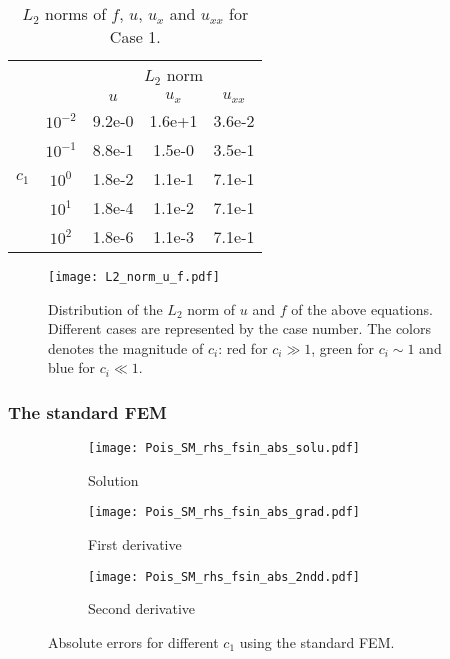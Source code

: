 \documentclass[final,3p]{elsarticle}
\begin{document}
\begin{table}[!ht]
\centering
\begin{tabular}{|c|c|c|c|c|} \hline   
\multicolumn{2}{|c|}{} &\multicolumn{3}{c|}{$L_2$ norm}  \\	%
\cline{3-5}
\multicolumn{2}{|c|}{}& $u$ & $u_{x}$ & $u_{xx}$ \\	%
\hline
\multirow{5}{*}{$c_1$}
&$10^{-2}$& 9.2e-0 & 1.6e+1 & 3.6e-2 \\
\cline{2-5}  
&$10^{-1}$& 8.8e-1 & 1.5e-0 & 3.5e-1 \\
\cline{2-5}   
&$10^{0}$& 1.8e-2 & 1.1e-1 & 7.1e-1 \\
\cline{2-5}   
&$10^{1}$& 1.8e-4 & 1.1e-2 & 7.1e-1 \\
\cline{2-5}  
&$10^{2}$ & 1.8e-6 & 1.1e-3 & 7.1e-1 \\
\hline 
\end{tabular}
\caption [sss] {$L_2$ norms of $f$, $u$, $u_{x}$ and $u_{xx}$ for Case 1.}
\label{Table: L2 norm Poisson fsin} 
\end{table}

\begin{figure}[!ht]
\centering
      \texttt{[image: L2\_norm\_u\_f.pdf]}
\caption{Distribution of the $L_2$ norm of $u$ and $f$ of the above equations. Different cases are represented by the case number. The colors denotes the magnitude of $c_i$: red for $c_i \gg 1$, green for $c_i \sim 1$ and blue for $c_i \ll 1$.}
\label{Fig:L2 norm u f}
\end{figure}

\subsubsection{The standard FEM}		\label{scaling_std_FEM}

\begin{figure}[!ht]
    \begin{subfigure}{5.5cm}
        \texttt{[image: Pois\_SM\_rhs\_fsin\_abs\_solu.pdf]}
        \caption{Solution}
        \label{Fig:Pois_SM_rhs_fsin_abs_solu}
    \end{subfigure}
    \begin{subfigure}{5.5cm}
        \texttt{[image: Pois\_SM\_rhs\_fsin\_abs\_grad.pdf]}
        \caption{First derivative}
        \label{Fig:Pois_SM_rhs_fsin_abs_grad}
    \end{subfigure}
    \begin{subfigure}{5.5cm}
        \texttt{[image: Pois\_SM\_rhs\_fsin\_abs\_2ndd.pdf]}
        \caption{Second derivative}
        \label{Fig:Pois_SM_rhs_fsin_abs_2ndd}
    \end{subfigure}
\caption{Absolute errors for different $c_1$ using the standard FEM.}   
\label{Pois_SM_rhs_solu orig}
\end{figure}
\end{document}
